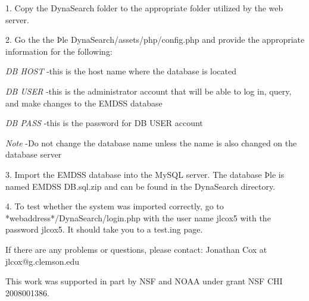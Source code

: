 \documentclass[article]{ij4uq}              %
\begin{document}
1. Copy the DynaSearch folder to the appropriate folder utilized by the web server. 

2. Go the the Þle DynaSearch/assets/php/config.php and provide the 
appropriate information for the following: 


\emph{DB HOST} -this is the host name where the database is located
	
\emph{DB USER} -this is the administrator account that will be able to log in, query, and make changes to the EMDSS database
	
\emph{DB PASS} -this is the password for DB USER account
	
\emph{Note} -Do not change the database name unless the name is also changed 
on the database server 

3. Import the EMDSS database into the MySQL server. The database Þle is named EMDSS DB.sql.zip and can be found in the DynaSearch directory. 


4. To test whether the system was imported correctly, go to *webaddress*/DynaSearch/login.php with the user name jlcox5 with the password jlcox5. It should take you to a test.ing page. 

If there are any problems or questions, please contact: 
Jonathan Cox at jlcox@g.clemson.edu 

\acknowledgements

This work was supported in part by NSF and NOAA under grant NSF CHI 2008001386.















\end{document}
